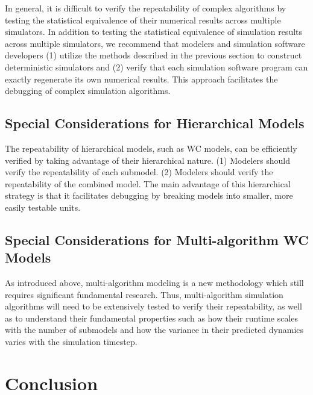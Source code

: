 \documentclass[journal,transmag,twoside]{IEEEtran}
\begin{document}
In general, it is difficult to verify the repeatability of complex algorithms by testing the statistical equivalence of their numerical results across multiple simulators. In addition to testing the statistical equivalence of simulation results across multiple simulators, we recommend that modelers and simulation software developers (1) utilize the methods described in the previous section to construct deterministic simulators and (2) verify that each simulation software program can exactly regenerate its own numerical results. This approach facilitates the debugging of complex simulation algorithms.

\subsection{Special Considerations for Hierarchical Models}
The repeatability of hierarchical models, such as WC models, can be efficiently verified by taking advantage of their hierarchical nature. (1) Modelers should verify the repeatability of each submodel. (2) Modelers should verify the repeatability of the combined model. The main advantage of this hierarchical strategy is that it facilitates debugging by breaking models into smaller, more easily testable units. 

\subsection{Special Considerations for Multi-algorithm WC Models}
As introduced above, multi-algorithm modeling is a new methodology which still requires significant fundamental research. Thus, multi-algorithm simulation algorithms will need to be extensively tested to verify their repeatability, as well as to understand their fundamental properties such as how their runtime scales with the number of submodels and how the variance in their predicted dynamics varies with the simulation timestep.

\section{Conclusion}
\end{document}
